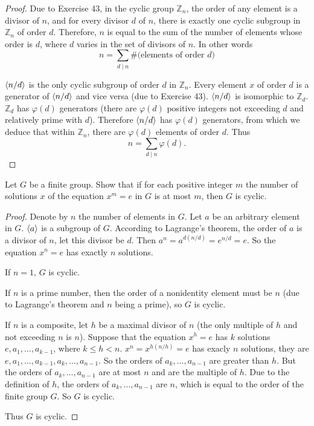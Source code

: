 \begin{proof}
    Due to Exercise 43, in the cyclic group $\mathbb{Z}_{n}$, the order of any element is a divisor of $n$, and for every divisor $d$ of $n$, there is exactly one cyclic subgroup in $\mathbb{Z}_{n}$ of order $d$. Therefore, $n$ is equal to the sum of the number of elements whose order is $d$, where $d$ varies in the set of divisors of $n$. In other words
    \[
        n = \sum_{d \mid n}\#\text{(elements of order $d$)}
    \]

    $\left\langle{n/d}\right\rangle$ is the only cyclic subgroup of order $d$ in $\mathbb{Z}_{n}$. Every element $x$ of order $d$ is a generator of $\left\langle{n/d}\right\rangle$ and vice versa (due to Exercise 43). $\left\langle{n/d}\right\rangle$ is isomorphic to $\mathbb{Z}_{d}$. $\mathbb{Z}_{d}$ has $\varphi(d)$ generators (there are $\varphi(d)$ positive integers not exceeding $d$ and relatively prime with $d$). Therefore $\left\langle{n/d}\right\rangle$ has $\varphi(d)$ generators, from which we deduce that within $\mathbb{Z}_{n}$, there are $\varphi(d)$ elements of order $d$. Thus
    \[
        n = \sum_{d \mid n}\varphi(d).
    \]
\end{proof}

\begin{exercise}
    Let $G$ be a finite group. Show that if for each positive integer $m$ the number of solutions $x$ of the equation $x^{m} = e$ in $G$ is at most $m$, then $G$ is cyclic.
\end{exercise}

\begin{proof}
    Denote by $n$ the number of elements in $G$. Let $a$ be an arbitrary element in $G$. $\left\langle{a}\right\rangle$ is a subgroup of $G$. According to Lagrange's theorem, the order of $a$ is a divisor of $n$, let this divisor be $d$. Then $a^{n} = a^{d(n/d)} = e^{n/d} = e$. So the equation $x^{n} = e$ has exactly $n$ solutions.

    If $n = 1$, $G$ is cyclic.

    If $n$ is a prime number, then the order of a nonidentity element must be $n$ (due to Lagrange's theorem and $n$ being a prime), so $G$ is cyclic.

    If $n$ is a composite, let $h$ be a maximal divisor of $n$ (the only multiple of $h$ and not exceeding $n$ is $n$). Suppose that the equation $x^{h} = e$ has $k$ solutions $e, a_{1}, \ldots, a_{k-1}$, where $k\leq h < n$. $x^{n} = x^{h(n/h)} = e$ has exacly $n$ solutions, they are $e, a_{1}, \ldots, a_{k-1}, a_{k}, \ldots, a_{n-1}$. So the orders of $a_{k}, \ldots, a_{n-1}$ are greater than $h$. But the orders of $a_{k}, \ldots, a_{n-1}$ are at most $n$ and are the multiple of $h$. Due to the definition of $h$, the orders of $a_{k}, \ldots, a_{n-1}$ are $n$, which is equal to the order of the finite group $G$. So $G$ is cyclic.

    Thus $G$ is cyclic.
\end{proof}

